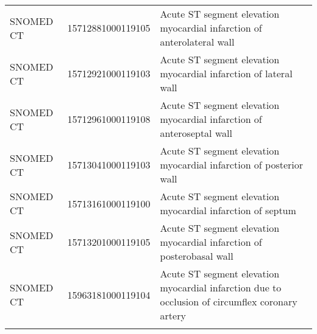 \begin{longtable}{p{}p{}p{}}
  SNOMED CT & 15712881000119105 & Acute ST segment elevation myocardial infarction of anterolateral wall \\ 
  SNOMED CT & 15712921000119103 & Acute ST segment elevation myocardial infarction of lateral wall \\ 
  SNOMED CT & 15712961000119108 & Acute ST segment elevation myocardial infarction of anteroseptal wall \\ 
  SNOMED CT & 15713041000119103 & Acute ST segment elevation myocardial infarction of posterior wall \\ 
  SNOMED CT & 15713161000119100 & Acute ST segment elevation myocardial infarction of septum \\ 
  SNOMED CT & 15713201000119105 & Acute ST segment elevation myocardial infarction of posterobasal wall \\ 
  SNOMED CT & 15963181000119104 & Acute ST segment elevation myocardial infarction due to occlusion of circumflex coronary artery \\ 
  \hline
\label{tab:codes_acute-myocardial-infarction}
\end{longtable}
